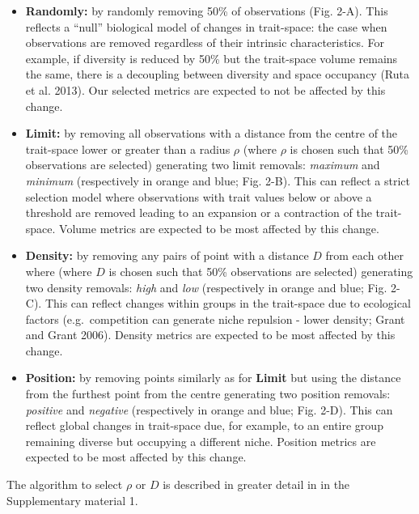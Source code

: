 \documentclass[]{article}
\begin{document}
\begin{itemize}
\item
  \textbf{Randomly:} by randomly removing 50\% of observations (Fig.
  2-A). This reflects a ``null'' biological model of changes in
  trait-space: the case when observations are removed regardless of
  their intrinsic characteristics. For example, if diversity is reduced
  by 50\% but the trait-space volume remains the same, there is a
  decoupling between diversity and space occupancy (Ruta et al. 2013).
  Our selected metrics are expected to not be affected by this change.
\item
  \textbf{Limit:} by removing all observations with a distance from the
  centre of the trait-space lower or greater than a radius \(\rho\)
  (where \(\rho\) is chosen such that 50\% observations are selected)
  generating two limit removals: \emph{maximum} and \emph{minimum}
  (respectively in orange and blue; Fig. 2-B). This can reflect a strict
  selection model where observations with trait values below or above a
  threshold are removed leading to an expansion or a contraction of the
  trait-space. Volume metrics are expected to be most affected by this
  change.
\item
  \textbf{Density:} by removing any pairs of point with a distance \(D\)
  from each other where (where \(D\) is chosen such that 50\%
  observations are selected) generating two density removals:
  \emph{high} and \emph{low} (respectively in orange and blue; Fig.
  2-C). This can reflect changes within groups in the trait-space due to
  ecological factors (e.g.~competition can generate niche repulsion -
  lower density; Grant and Grant 2006). Density metrics are expected to
  be most affected by this change.
\item
  \textbf{Position:} by removing points similarly as for \textbf{Limit}
  but using the distance from the furthest point from the centre
  generating two position removals: \emph{positive} and \emph{negative}
  (respectively in orange and blue; Fig. 2-D). This can reflect global
  changes in trait-space due, for example, to an entire group remaining
  diverse but occupying a different niche. Position metrics are expected
  to be most affected by this change.
\end{itemize}

The algorithm to select \(\rho\) or \(D\) is described in greater detail
in in the Supplementary material 1.
\end{document}

